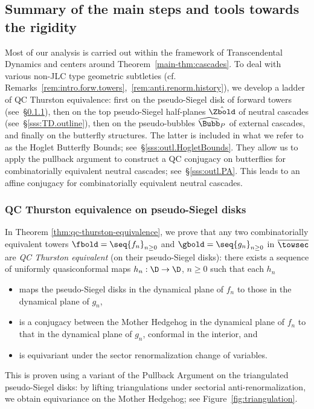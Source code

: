 \documentclass{amsart}
\begin{document}
\subsection{Summary of the main steps and tools towards the rigidity}
\label{ss:outline} Most of our analysis is carried out within the framework of Transcendental Dynamics and centers around Theorem~\ref{main-thm:cascades}. To deal with various non-JLC type geometric subtleties (cf. Remarks~\ref{rem:intro.forw.towers},~\ref{rem:anti.renorm.history}), we develop a ladder of QC Thurston equivalence: 
first on the pseudo-Siegel disk of forward towers (see~\S\ref{sss:qc.Thurst.eq}), 
then on the top pseudo-Siegel half-planes $\hat{\Zbold}$ of neutral cascades (see~\S\ref{sss:TD.outline}), 
then on the  pseudo-bubbles $\widehat \Bubb_P$ of external cascades, 
and finally on the butterfly structures. 
The latter is included in what we refer to as the Hoglet Butterfly Bounds; see~\S\ref{sss:outl.HogletBounds}. They allow us to apply the pullback argument to construct a QC conjugacy on butterflies for combinatorially equivalent neutral cascades; see~\S\ref{sss:outl.PA}. This leads to an affine conjugacy for combinatorially equivalent neutral cascades.


\subsubsection{QC Thurston equivalence on pseudo-Siegel disks}\label{sss:qc.Thurst.eq} In Theorem \ref{thm:qc-thurston-equivalence}, we prove that any two combinatorially equivalent towers $\fbold = \seq{f_n}_{n\geq 0}$ and $\gbold = \seq{g_n}_{n\geq 0}$ in $\overline{\towsec}$ are \emph{QC Thurston equivalent} (on their pseudo-Siegel disks): there exists a sequence of uniformly quasiconformal maps $h_n: \D \to \D$, $n \geq 0$ such that each $h_n$
\begin{itemize}
    \item maps the pseudo-Siegel disks in the dynamical plane of $f_n$ to those in the dynamical plane of $g_n$, 
    \item is a conjugacy between the Mother Hedgehog in the dynamical plane of $f_n$ to that in the dynamical plane of $g_n$, conformal in the interior, and
    \item is equivariant under the sector renormalization change of variables.
\end{itemize}
This is proven using a variant of the Pullback Argument on the triangulated pseudo-Siegel disks: by lifting triangulations under sectorial anti-renormalization, we obtain equivariance on the Mother Hedgehog; see Figure~\ref{fig:triangulation}.    
\end{document}
